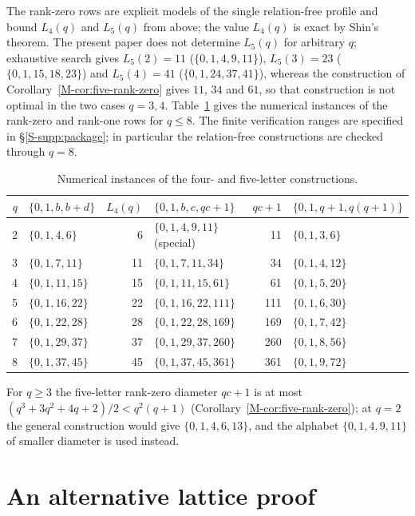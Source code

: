 \documentclass[11pt,reqno]{amsart}
\theoremstyle{plain}
\theoremstyle{definition}
\theoremstyle{plain}
\theoremstyle{plain}
\theoremstyle{plain}
\theoremstyle{plain}
\theoremstyle{plain}
\theoremstyle{plain}
\theoremstyle{definition}
\theoremstyle{definition}
\theoremstyle{definition}
\theoremstyle{plain}
\begin{document}
The rank-zero rows are explicit models of the single relation-free profile
and bound $L_4(q)$ and $L_5(q)$ from above; the value $L_4(q)$ is exact by
Shin's theorem. The present paper does not determine $L_5(q)$ for arbitrary $q$; exhaustive search
 gives $L_5(2)=11$ ($\{0,1,4,9,11\}$),
$L_5(3)=23$ ($\{0,1,15,18,23\}$) and $L_5(4)=41$ ($\{0,1,24,37,41\}$),
whereas the construction of Corollary~\ref{M-cor:five-rank-zero} gives $11$, $34$ and $61$, so that
construction is not optimal in the two cases $q=3,4$. Table~\ref{S-tab:instances}
gives the numerical instances of the rank-zero and rank-one rows for
$q\le8$. The finite verification ranges are specified in \S\ref{S-supp:package};
in particular the relation-free constructions are checked through $q=8$.

\begin{table}[htbp]
\caption{Numerical instances of the four- and five-letter constructions.}
\label{S-tab:instances}
\begin{center}\small
\begin{tabular}{@{}rlrlrl@{}}
\toprule
$q$ & $\{0,1,b,b+d\}$ & $L_4(q)$ & $\{0,1,b,c,qc+1\}$ & $qc+1$ & $\{0,1,q+1,q(q+1)\}$\\
\midrule
2 & $\{0,1,4,6\}$ & 6 & $\{0,1,4,9,11\}$ (special) & 11 & $\{0,1,3,6\}$\\
3 & $\{0,1,7,11\}$ & 11 & $\{0,1,7,11,34\}$ & 34 & $\{0,1,4,12\}$\\
4 & $\{0,1,11,15\}$ & 15 & $\{0,1,11,15,61\}$ & 61 & $\{0,1,5,20\}$\\
5 & $\{0,1,16,22\}$ & 22 & $\{0,1,16,22,111\}$ & 111 & $\{0,1,6,30\}$\\
6 & $\{0,1,22,28\}$ & 28 & $\{0,1,22,28,169\}$ & 169 & $\{0,1,7,42\}$\\
7 & $\{0,1,29,37\}$ & 37 & $\{0,1,29,37,260\}$ & 260 & $\{0,1,8,56\}$\\
8 & $\{0,1,37,45\}$ & 45 & $\{0,1,37,45,361\}$ & 361 & $\{0,1,9,72\}$\\
\bottomrule
\end{tabular}
\end{center}
\end{table}

For $q\ge3$ the five-letter rank-zero diameter $qc+1$ is at most
$(q^3+3q^2+4q+2)/2<q^2(q+1)$ (Corollary~\ref{M-cor:five-rank-zero}); at $q=2$ the general
construction would give $\{0,1,4,6,13\}$, and the alphabet $\{0,1,4,9,11\}$
of smaller diameter is used instead.

\section{An alternative lattice proof}\label{S-supp:lattice}
\end{document}
